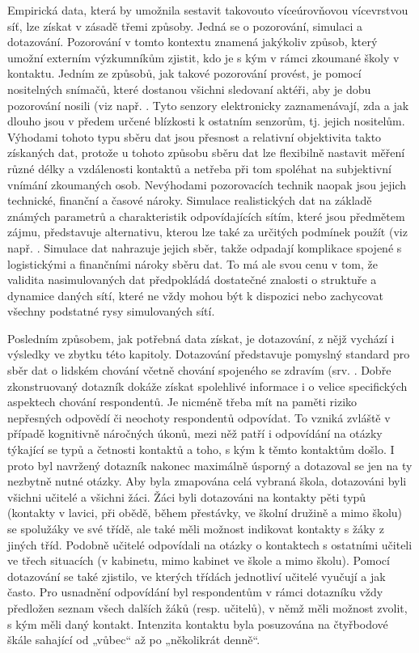 Empirická data, která by umožnila sestavit takovouto víceúrovňovou vícevrstvou síť, lze získat v zásadě třemi způsoby. Jedná se o pozorování, simulaci a dotazování. Pozorování v tomto kontextu znamená jakýkoliv způsob, který umožní externím výzkumníkům zjistit, kdo je s kým v rámci zkoumané školy v kontaktu. Jedním ze způsobů, jak takové pozorování provést, je pomocí nositelných snímačů, které dostanou všichni sledovaní aktéři, aby je dobu pozorování nosili (viz např. \cite{stehle2011high, gemmetto2014mitigation}. Tyto senzory elektronicky zaznamenávají, zda a jak dlouho jsou v předem určené blízkosti k ostatním senzorům, tj. jejich nositelům. Výhodami tohoto typu sběru dat jsou přesnost a relativní objektivita takto získaných dat, protože u tohoto způsobu sběru dat lze flexibilně nastavit měření různé délky a vzdálenosti kontaktů a netřeba při tom spoléhat na subjektivní vnímání zkoumaných osob. Nevýhodami pozorovacích technik naopak jsou jejich technické, finanční a časové nároky. Simulace realistických dat na základě známých parametrů a charakteristik odpovídajících sítím, které jsou předmětem zájmu, představuje alternativu, kterou lze také za určitých podmínek použít (viz např. \cite{mcgee2021model, potter2012estimating}. Simulace dat nahrazuje jejich sběr, takže odpadají komplikace spojené s logistickými a finančními nároky sběru dat. To má ale svou cenu v tom, že validita nasimulovaných dat předpokládá dostatečné znalosti o struktuře a dynamice daných sítí, které ne vždy mohou být k dispozici nebo zachycovat všechny podstatné rysy simulovaných sítí.

Posledním způsobem, jak potřebná data získat, je dotazování, z nějž vychází i výsledky ve zbytku této kapitoly. Dotazování představuje pomyslný standard pro sběr dat o lidském chování včetně chování spojeného se zdravím (srv. \cite{danon2011networks, luke2007network, zaj:mossong2008social}. Dobře zkonstruovaný dotazník dokáže získat spolehlivé informace i o velice specifických aspektech chování respondentů. Je nicméně třeba mít na paměti riziko nepřesných odpovědí či neochoty respondentů odpovídat. To vzniká zvláště v případě kognitivně náročných úkonů, mezi něž patří i odpovídání na otázky týkající se typů a četnosti kontaktů a toho, s kým k těmto kontaktům došlo. I proto byl navržený dotazník nakonec maximálně úsporný a dotazoval se jen na ty nezbytně nutné otázky. Aby byla zmapována celá vybraná škola, dotazováni byli všichni učitelé a všichni žáci. Žáci byli dotazováni na kontakty pěti typů (kontakty v lavici, při obědě, během přestávky, ve školní družině a mimo školu) se spolužáky ve své třídě, ale také měli možnost indikovat kontakty s žáky z jiných tříd. Podobně učitelé odpovídali na otázky o kontaktech s ostatními učiteli ve třech situacích (v kabinetu, mimo kabinet ve škole a mimo školu). Pomocí dotazování se také zjistilo, ve kterých třídách jednotliví učitelé vyučují a jak často. Pro usnadnění odpovídání byl respondentům v rámci dotazníku vždy předložen seznam všech dalších žáků (resp. učitelů), v němž měli možnost zvolit, s kým měli daný kontakt. Intenzita kontaktu byla posuzována na čtyřbodové škále sahající od „vůbec“ až po „několikrát denně“.


